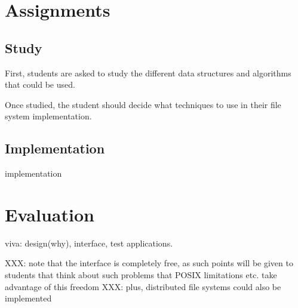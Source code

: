 \section{Assignments}


\subsection{Study}

First, students are asked to study the different data structures and algorithms
that could be used.

Once studied, the student should decide what techniques to use in their
file system implementation.


\subsection{Implementation}

implementation

%
%

\section{Evaluation}

viva: design(why), interface, test applications.

XXX: note that the interface is completely free, as such points will be given
  to students that think about such problems that POSIX limitations etc.
  take advantage of this freedom
XXX: plus, distributed file systems could also be implemented
